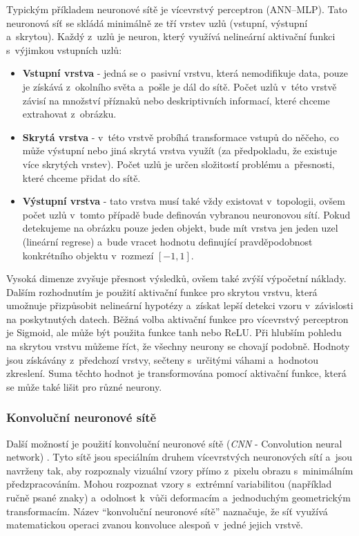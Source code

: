 Typickým příkladem neuronové sítě je vícevrstvý perceptron (ANN--MLP). Tato neuronová síť se skládá minimálně ze tří vrstev uzlů (vstupní, výstupní a~skrytou). Každý z~uzlů je neuron, který využívá nelineární aktivační funkci s~výjimkou vstupních uzlů:
\begin{itemize}
  \item{\textbf{Vstupní vrstva} - jedná se o~pasivní vrstvu, která nemodifikuje data, pouze je získává z~okolního světa a~pošle je dál do sítě. Počet uzlů v~této vrstvě závisí na množství příznaků nebo deskriptivních informací, které chceme extrahovat z~obrázku.}
  \item{\textbf{Skrytá vrstva} - v~této vrstvě probíhá transformace vstupů do něčeho, co může výstupní nebo jiná skrytá vrstva využít (za předpokladu, že existuje více skrytých vrstev). Počet uzlů je určen složitostí problému a~přesnosti, které chceme přidat do sítě. }
  \item{\textbf{Výstupní vrstva} - tato vrstva musí také vždy existovat v~topologii, ovšem počet uzlů v~tomto případě bude definován vybranou neuronovou sítí. Pokud detekujeme na obrázku pouze jeden objekt, bude mít vrstva jen jeden uzel (lineární regrese) a~bude vracet hodnotu definující pravděpodobnost konkrétního objektu v~rozmezí $[-1,1]$.}
\end{itemize}

Vysoká dimenze zvyšuje přesnost výsledků, ovšem také zvýší výpočetní náklady. Dalším rozhodnutím je použití aktivační funkce pro skrytou vrstvu, která umožnuje přizpůsobit nelineární hypotézy a~získat lepší detekci vzoru v~závislosti na poskytnutých datech. Běžná volba aktivační funkce pro vícevrstvý perceptron je Sigmoid, ale může být použita funkce tanh nebo ReLU. Při hlubším pohledu na skrytou vrstvu můžeme říct, že všechny neurony se chovají podobně. Hodnoty jsou získávány z~předchozí vrstvy, sečteny s~určitými váhami a~hodnotou zkreslení.
Suma těchto hodnot je transformována pomocí aktivační funkce, která se může také lišit pro různé neurony.


\subsubsection*{Konvoluční neuronové sítě}
Další možností je použití konvoluční neuronové sítě (\textit{CNN} - Convolution neural network) \cite{lenet}. Tyto sítě jsou speciálním druhem vícevrstvých neuronových sítí a~jsou navrženy tak, aby rozpoznaly vizuální vzory přímo z~pixelu obrazu s~minimálním předzpracováním. Mohou rozpoznat vzory s~extrémní variabilitou (například ručně psané znaky) a~odolnost k~vůči deformacím a~jednoduchým geometrickým transformacím. Název ``konvoluční neuronové sítě'' naznačuje, že síť využívá matematickou operaci zvanou konvoluce alespoň v~jedné jejich vrstvě.

